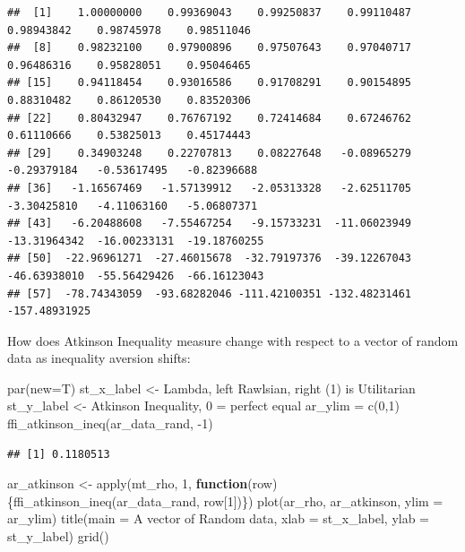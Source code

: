 \documentclass[
]{book}
\newenvironment{Shaded}{\begin{snugshade}}{\end{snugshade}}
\newcommand{\AttributeTok}[1]{\textcolor[rgb]{0.77,0.63,0.00}{#1}}
\newcommand{\ControlFlowTok}[1]{\textcolor[rgb]{0.13,0.29,0.53}{\textbf{#1}}}
\newcommand{\DecValTok}[1]{\textcolor[rgb]{0.00,0.00,0.81}{#1}}
\newcommand{\FunctionTok}[1]{\textcolor[rgb]{0.00,0.00,0.00}{#1}}
\newcommand{\NormalTok}[1]{#1}
\newcommand{\OtherTok}[1]{\textcolor[rgb]{0.56,0.35,0.01}{#1}}
\newcommand{\SpecialCharTok}[1]{\textcolor[rgb]{0.00,0.00,0.00}{#1}}
\newcommand{\StringTok}[1]{\textcolor[rgb]{0.31,0.60,0.02}{#1}}
\begin{document}
\begin{verbatim}
##  [1]    1.00000000    0.99369043    0.99250837    0.99110487    0.98943842    0.98745978    0.98511046
##  [8]    0.98232100    0.97900896    0.97507643    0.97040717    0.96486316    0.95828051    0.95046465
## [15]    0.94118454    0.93016586    0.91708291    0.90154895    0.88310482    0.86120530    0.83520306
## [22]    0.80432947    0.76767192    0.72414684    0.67246762    0.61110666    0.53825013    0.45174443
## [29]    0.34903248    0.22707813    0.08227648   -0.08965279   -0.29379184   -0.53617495   -0.82396688
## [36]   -1.16567469   -1.57139912   -2.05313328   -2.62511705   -3.30425810   -4.11063160   -5.06807371
## [43]   -6.20488608   -7.55467254   -9.15733231  -11.06023949  -13.31964342  -16.00233131  -19.18760255
## [50]  -22.96961271  -27.46015678  -32.79197376  -39.12267043  -46.63938010  -55.56429426  -66.16123043
## [57]  -78.74343059  -93.68282046 -111.42100351 -132.48231461 -157.48931925
\end{verbatim}

How does Atkinson Inequality measure change with respect to a vector of random data as inequality aversion shifts:

\begin{Shaded}
\begin{Highlighting}[]
\FunctionTok{par}\NormalTok{(}\AttributeTok{new=}\NormalTok{T)}
\NormalTok{st\_x\_label }\OtherTok{\textless{}{-}} \StringTok{\textquotesingle{}Lambda, left Rawlsian, right (1) is Utilitarian\textquotesingle{}}
\NormalTok{st\_y\_label }\OtherTok{\textless{}{-}} \StringTok{\textquotesingle{}Atkinson Inequality, 0 = perfect equal\textquotesingle{}}
\NormalTok{ar\_ylim }\OtherTok{=} \FunctionTok{c}\NormalTok{(}\DecValTok{0}\NormalTok{,}\DecValTok{1}\NormalTok{)}
\FunctionTok{ffi\_atkinson\_ineq}\NormalTok{(ar\_data\_rand, }\SpecialCharTok{{-}}\DecValTok{1}\NormalTok{)}
\end{Highlighting}
\end{Shaded}

\begin{verbatim}
## [1] 0.1180513
\end{verbatim}

\begin{Shaded}
\begin{Highlighting}[]
\NormalTok{ar\_atkinson }\OtherTok{\textless{}{-}} \FunctionTok{apply}\NormalTok{(mt\_rho, }\DecValTok{1}\NormalTok{, }\ControlFlowTok{function}\NormalTok{(row)\{}\FunctionTok{ffi\_atkinson\_ineq}\NormalTok{(ar\_data\_rand, row[}\DecValTok{1}\NormalTok{])\})}
\FunctionTok{plot}\NormalTok{(ar\_rho, ar\_atkinson, }\AttributeTok{ylim =}\NormalTok{ ar\_ylim)}
\FunctionTok{title}\NormalTok{(}\AttributeTok{main =} \StringTok{\textquotesingle{}A vector of Random data\textquotesingle{}}\NormalTok{, }\AttributeTok{xlab =}\NormalTok{ st\_x\_label, }\AttributeTok{ylab =}\NormalTok{ st\_y\_label)}
\FunctionTok{grid}\NormalTok{()}
\end{Highlighting}
\end{Shaded}
\end{document}

